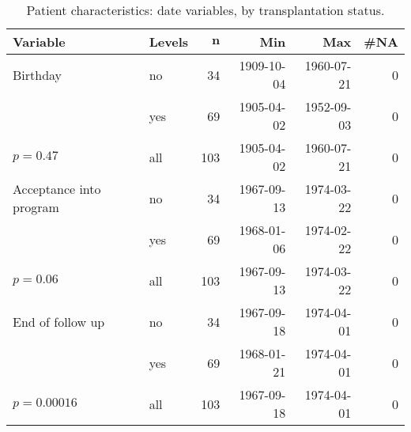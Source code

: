 \documentclass[nojss]{jss}\usepackage[]{graphicx}\usepackage[]{color}
\begin{document}
\renewcommand{\baselinestretch}{1.15}
\begin{center}
\begin{table}[ht]
\centering
{\footnotesize
\begin{tabular}{llrrrr}
 \textbf{Variable} & \textbf{Levels} & $\mathbf{n}$ & \textbf{Min} & \textbf{Max} & \textbf{\#NA} \\ 
  \hline
Birthday & no &  34 & 1909-10-04 & 1960-07-21 &   0 \\ 
   & yes &  69 & 1905-04-02 & 1952-09-03 &   0 \\ 
   \hline
$p= 0.47$ & all & 103 & 1905-04-02 & 1960-07-21 &   0 \\ 
   \hline
\hline
Acceptance into program & no &  34 & 1967-09-13 & 1974-03-22 &   0 \\ 
   & yes &  69 & 1968-01-06 & 1974-02-22 &   0 \\ 
   \hline
$p= 0.06$ & all & 103 & 1967-09-13 & 1974-03-22 &   0 \\ 
   \hline
\hline
End of follow up & no &  34 & 1967-09-18 & 1974-04-01 &   0 \\ 
   & yes &  69 & 1968-01-21 & 1974-04-01 &   0 \\ 
   \hline
$p= 0.00016$ & all & 103 & 1967-09-18 & 1974-04-01 &   0 \\ 
   \hline
\hline
\end{tabular}
}
\caption{Patient characteristics: date variables, by transplantation status.} 
\label{tab: date1}
\end{table}

\end{center}
\renewcommand{\baselinestretch}{1}
\end{document}
